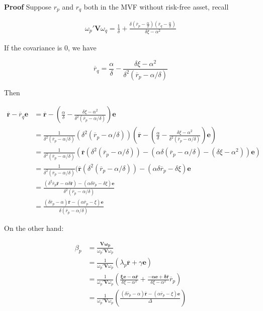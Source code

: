 \documentclass{article}
\begin{document}
\textbf{Proof} Suppose \(r_p\) and \(r_q\) both in the MVF without
risk-free asset, recall

\[ \begin{aligned}
  \omega_p'\mathbf{V}\omega_q=\frac{1}{\delta}+\frac{\delta(\overline{r}_p-\frac{\alpha}{\delta})(\overline{r}_q-\frac{\alpha}{\delta})}{\delta\xi-\alpha^2}
\end{aligned} \]

If the covariance is \(0\), we have

\[ \overline{r}_q=\frac{\alpha}{\delta}-\frac{\delta\xi-\alpha^2}{\delta^2(\overline{r}_p-\alpha/\delta)} \]

Then

\[ \begin{aligned}
  \mathbf{\overline{r}}-\overline{r}_q \mathbf{e}&=\mathbf{\overline{r}}-(\frac{\alpha}{\delta}-\frac{\delta\xi-\alpha^2}{\delta^2(\overline{r}_p-\alpha/\delta)})\mathbf{e}
  \\&=\frac{1}{\delta^2(\overline{r}_p-\alpha/\delta)}(\delta^2(\overline{r}_p-\alpha/\delta))(\mathbf{\overline{r}}-(\frac{\alpha}{\delta}-\frac{\delta\xi-\alpha^2}{\delta^2(\overline{r}_p-\alpha/\delta)})\mathbf{e})
  \\&=\frac{1}{\delta^2(\overline{r}_p-\alpha/\delta)}(\mathbf{\overline{r}}(\delta^2(\overline{r}_p-\alpha/\delta))-(\alpha\delta(\overline{r}_p-\alpha/\delta)-(\delta\xi-\alpha^2))\mathbf{e})
  \\&=\frac{1}{\delta^2(\overline{r}_p-\alpha/\delta)}(\mathbf{\overline{r}}(\delta^2(\overline{r}_p-\alpha/\delta))-(\alpha\delta\overline{r}_p-\delta\xi)\mathbf{e}
  \\&=\frac{
    (\delta^2\overline{r}_p\mathbf{\overline{r}}-\alpha\delta\mathbf{\overline{r}})-(\alpha\delta\overline{r}_p-\delta\xi)\mathbf{e}}
  {\delta^2(\overline{r}_p-\alpha/\delta)}
  \\&=\frac{
    (\delta\overline{r}_p-\alpha)\mathbf{\overline{r}}-(\alpha\overline{r}_p-\xi)\mathbf{e}}
  {\delta(\overline{r}_p-\alpha/\delta)}
\end{aligned} \]

On the other hand:

\[ \begin{aligned}
  \beta_p&=\frac{\mathbf{V\omega_p}}{\omega_p'\mathbf{V}\omega_p}
  \\&=\frac{1}{\omega_p'\mathbf{V}\omega_p}(\lambda_p\overline{\mathbf{r}}+\gamma \mathbf{e})
  \\&=\frac{1}{\omega_p'\mathbf{V}\omega_p}(\frac{\mathbf{\xi e-\alpha  \overline{r}}}{\delta\xi-\alpha^2}+\frac{\mathbf{-\alpha e+\delta\overline{r}}}{\delta\xi-\alpha^2}\overline{r}_p)
  \\&=\frac{1}{\omega_p'\mathbf{V}\omega_p}(\frac{ (\delta\overline{r}_p-\alpha)\mathbf{\overline{r}}-(\alpha\overline{r}_p-\xi)\mathbf{e}}{\Delta})
\end{aligned} \]
\end{document}

